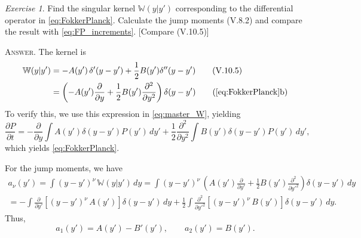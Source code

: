 \documentclass{book}
\numberwithin{equation}{section}
\theoremstyle{plain}
\theoremstyle{definition}
\theoremstyle{remark}
\theoremstyle{BoldStyle}
\newtheorem{exercise}{Exercise}
\numberwithin{exercise}{section}
\newcommand{\answer}[1]{{\color{DarkBlue}\footnotesize \textsc{Answer.} #1}}
\begin{document}
\begin{exercise}
  Find the singular kernel $\mathbb W(y|y')$
  corresponding to the differential operator in \eqref{eq:FokkerPlanck}.
  Calculate the jump moments (V.8.2)
  and compare the result with \eqref{eq:FP_increments}.
  [Compare (V.10.5)]


  \answer{
    The kernel is
    \begin{align}
        \mathbb W(y|y')
        &=
          -A(y') \, \delta'(y - y')
          +
          \frac 1 2
          B(y')
          \delta''(y - y')
        \tag{V.10.5} \\
        &=
        \left(
          -A(y') \frac{\partial }{\partial y }
          +
          \frac 1 2
          B(y')
          \frac{ \partial^2 } { \partial y^2 }
        \right)
        \delta(y - y')
        \tag{\ref{eq:FokkerPlanck}b}
        \label{eq:FP_Wkernel}
    \end{align}
    To verify this,
    we use this expression in \eqref{eq:master_W},
    yielding
    $$
    \frac{ \partial P } { \partial t }
    =
    -\frac{\partial }{\partial y }
    \int
      A(y')
    \delta(y - y') P(y') \, dy'
    +
    \frac 1 2
    \frac{\partial^2 }{\partial y^2 }
    \int
      B(y')
    \delta(y - y') P(y') \, dy',
    $$
    which yields \eqref{eq:FokkerPlanck}.

    For the jump moments, we have
    $$
    \begin{aligned}
    a_\nu(y')
    =
    \int (y - y')^\nu \, \mathbb W(y|y') \, dy
    =
    \int (y - y')^\nu \,
    \left(
      A(y') \frac{\partial }{\partial y' }
      +
      \frac 1 2
      B(y')
      \frac{ \partial^2 } { \partial y'^2 }
    \right)
    \delta(y - y')
    \, dy\\
    =
    -
    \int
      \frac{\partial }{\partial y' }
      \left[ (y - y')^\nu \, A(y') \right]
      \delta(y - y') \, dy
    +
      \frac 1 2
    \int
      \frac{ \partial^2 } { \partial y'^2 }
      \left[ (y - y')^\nu \, B(y') \right]
      \delta(y - y') \, dy
    .
    \end{aligned}
    $$
    Thus,
    $$
    a_1(y') = A(y') - B'(y'),
    \qquad
    a_2(y') = B(y').
    $$

}
\end{exercise}
\end{document}

